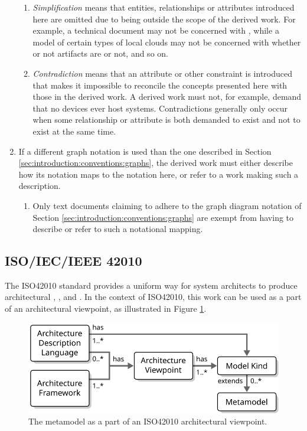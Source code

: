 \begin{enumerate}
\begin{enumerate}
	\item \textit{Simplification} means that entities, relationships or attributes introduced here are omitted due to being outside the scope of the derived work. For example, a technical document may not be concerned with , while a model of certain types of local clouds may not be concerned with whether or not artifacts are  or not, and so on.
	\item \textit{Contradiction} means that an attribute or other constraint is introduced that makes it impossible to reconcile the concepts presented here with those in the derived work. A derived work must not, for example, demand that no devices ever host systems. Contradictions generally only occur when some relationship or attribute is both demanded to exist and not to exist at the same time.
	\end{enumerate}
\item If a different graph notation is used than the one described in Section \ref{sec:introduction:conventions:graphs}, the derived work must either describe how its notation maps to the notation here, or refer to a work making such a description.
	\begin{enumerate}
	\item Only text documents claiming to adhere to the graph diagram notation of Section \ref{sec:introduction:conventions:graphs} are exempt from having to describe or refer to such a notational mapping.
	\end{enumerate}
\end{enumerate}

\subsection{ISO/IEC/IEEE 42010}
\label{sec:conformance:iso42010}

The ISO42010 \cite{iso42010} standard provides a uniform way for system architects to produce architectural , ,  and .
In the context of ISO42010, this work can be used as a  part of an architectural viewpoint, as illustrated in Figure \ref{fig:iso42010}.

\begin{figure}[ht!]
  \centering
  \includegraphics[scale=0.9]{figures/iso42010}
  \caption{
    The metamodel as a part of an ISO42010 architectural viewpoint.
  }
  \label{fig:iso42010}
\end{figure}